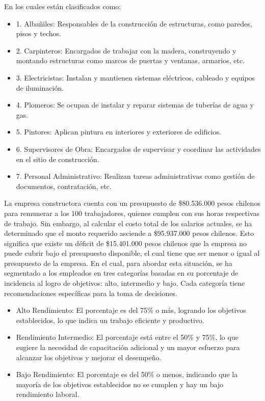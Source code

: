 \documentclass{plantillauft}
\begin{document}
En los cuales están clasificados como:
\begin{itemize}
    \item 1. Albañiles: Responsables de la construcción de estructuras, como paredes, pisos y techos.
    \item 2. Carpinteros: Encargados de trabajar con la madera, construyendo y montando estructuras como marcos de puertas y ventanas, armarios, etc.
    \item 3. Electricistas: Instalan y mantienen sistemas eléctricos, cableado y equipos de iluminación.
    \item 4. Plomeros: Se ocupan de instalar y reparar sistemas de tuberías de agua y gas.
    \item 5. Pintores: Aplican pintura en interiores y exteriores de edificios.
    \item 6. Supervisores de Obra: Encargados de supervisar y coordinar las actividades en el sitio de construcción.
    \item 7. Personal Administrativo: Realizan tareas administrativas como gestión de documentos, contratación, etc.
\end{itemize}
\newline
\newline
La empresa constructora cuenta con un presupuesto de \$80.536.000 pesos chilenos para remunerar a los 100 trabajadores, quienes cumplen con sus horas respectivas de trabajo. Sin embargo, al calcular el costo total de los salarios actuales, se ha determinado que el monto requerido asciende a \$95.937.000 pesos chilenos. Esto significa que existe un déficit de \$15.401.000 pesos chilenos que la empresa no puede cubrir bajo el presupuesto disponible, el cual tiene que ser menor o igual al presupuesto de la empresa.
\newline
\newline
En el cual, para abordar esta situación, se ha segmentado a los empleados en tres categorías basadas en su porcentaje de incidencia al logro de objetivos: alto, intermedio y bajo. Cada categoría tiene recomendaciones específicas para la toma de decisiones.
\begin{itemize}
    \item Alto Rendimiento: El porcentaje es del 75\% o más, logrando los objetivos establecidos, lo que indica un trabajo eficiente y productivo.
    \item Rendimiento Intermedio: El porcentaje está entre el 50\% y 75\%, lo que sugiere la necesidad de capacitación adicional y un mayor esfuerzo para alcanzar los objetivos y mejorar el desempeño.
    \item Bajo Rendimiento: El porcentaje es del 50\% o menos, indicando que la mayoría de los objetivos establecidos no se cumplen y hay un bajo rendimiento laboral.
\end{itemize}
\end{document}
